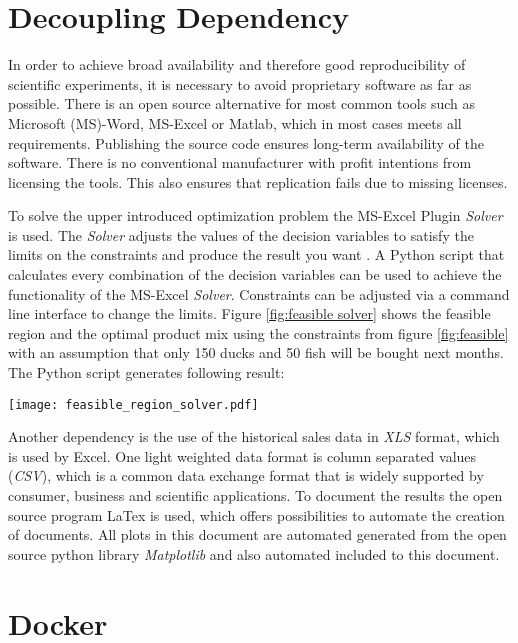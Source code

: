 \documentclass{article}
\begin{document}
\begin{multicols}{2}
\section{Decoupling Dependency}
In order to achieve broad availability and therefore good reproducibility of scientific experiments, it is necessary to avoid proprietary software as far as possible. There is an open source alternative for most common tools such as Microsoft (MS)-Word, MS-Excel or Matlab, which in most cases meets all requirements. Publishing the source code ensures long-term availability of the software. There is no conventional manufacturer with profit intentions from licensing the tools. This also ensures that replication fails due to missing licenses.

To solve the upper introduced optimization problem the MS-Excel Plugin \textit{Solver} is used. The \textit{Solver} adjusts the values of the decision variables to satisfy the limits on the constraints and produce the result you want \cite{microsoft}. A Python script that calculates every combination of the decision variables can be used to achieve the functionality of the MS-Excel \textit{Solver}. Constraints can be adjusted via a command line interface to change the limits. Figure \ref{fig:feasible solver} shows the feasible region and the optimal product mix using the constraints from figure \ref{fig:feasible} with an assumption that only 150 ducks and 50 fish will be bought next months. The Python script generates following result:

\begin{center}
\texttt{[image: feasible\_region\_solver.pdf]}
\label{fig:feasible solver}
\end{center}

Another dependency is the use of the historical sales data in \textit{XLS} format, which is used by Excel. One light weighted data format is column separated values (\textit{CSV}), which is a common data exchange format that is widely supported by consumer, business and scientific applications. To document the results the open source program LaTex is used, which offers possibilities to automate the creation of documents. All plots in this document are automated generated from the open source python library \textit{Matplotlib} and also automated included to this document.

\section{Docker} \label{sec:Docker}
%


\end{multicols}
\end{document}
